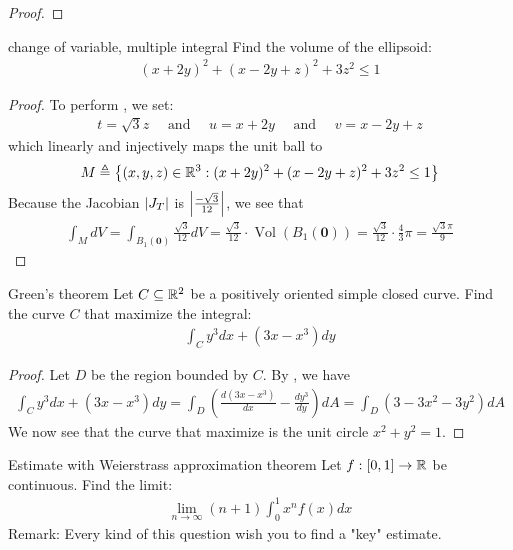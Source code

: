 \documentclass{report}
\begin{document}
\begin{proof}

\end{proof}
\begin{question}{change of variable, multiple integral}{}
Find the volume of the ellipsoid: 
\begin{align*}
  (x+2y)^2+ (x-2y+z)^2 +3z^2 \leq 1
\end{align*}
\end{question}
\begin{proof}
To perform , we set: 
\begin{align*}
t=\sqrt{3}z  \quad \text{ and }\quad u=x+2y \quad \text{ and }\quad v=x-2y+z
\end{align*}
which linearly and injectively maps the unit ball to
\begin{align*}
M\triangleq \left\{ (x,y,z)\in\mathbb{R}^3:(x+2y)^2 + (x-2y+z)^2 + 3z^2\leq  1 \right\}
\end{align*}
Because the Jacobian $\left|J_T\right|$ is $\left|\frac{-\sqrt{3} }{12}\right|$, we see that  
\begin{align*}
\int_M dV = \int_{B_1(\textbf{0})}  \frac{\sqrt{3}}{12}dV= \frac{\sqrt{3}}{12}\cdot \operatorname{Vol}(B_1(\textbf{0}))= \frac{\sqrt{3} }{12} \cdot \frac{4}{3} \pi = \frac{\sqrt{3} \pi }{9} 
\end{align*}
\end{proof}
\begin{question}{Green's theorem}{}
Let $C\subseteq \mathbb{R}^2$ be a positively oriented simple closed curve. Find the curve $C$ that maximize the integral: 
\begin{align}
\label{EQiC}
\int_C y^3 dx+ (3x-x^3)dy
\end{align}
\end{question}
\begin{proof}
Let $D$ be the region bounded by  $C$. By , we have 
\begin{align*}
\int_C y^3dx+ (3x-x^3)dy= \int_D \left(\frac{d(3x-x^3)}{dx} - \frac{dy^3}{dy} \right) dA= \int_D \left( 3-3x^2-3y^2 \right) dA
\end{align*}
We now see that the curve that maximize  is the unit circle $x^2+y^2=1$. 
\end{proof}
\begin{question}{Estimate with Weierstrass approximation theorem}{}
Let $f:[0,1]\rightarrow \mathbb{R}$ be continuous. Find the limit: 
\begin{align*}
\lim_{n\to \infty}(n+1)\int_0^1 x^nf(x)dx
\end{align*}
Remark: Every kind of this question wish you to find a "key" estimate. 
\end{question}
\end{document}
